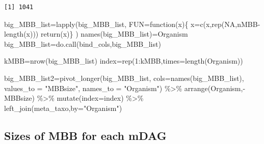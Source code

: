 \documentclass[
  letterpaper,
  DIV=11,
  numbers=noendperiod]{scrreprt}
\newenvironment{Shaded}{}{}
\newcommand{\AttributeTok}[1]{\textcolor[rgb]{0.78,0.47,0.87}{#1}}
\newcommand{\ConstantTok}[1]{\textcolor[rgb]{0.82,0.60,0.40}{#1}}
\newcommand{\ControlFlowTok}[1]{\textcolor[rgb]{0.78,0.47,0.87}{#1}}
\newcommand{\DecValTok}[1]{\textcolor[rgb]{0.82,0.60,0.40}{#1}}
\newcommand{\FunctionTok}[1]{\textcolor[rgb]{0.38,0.69,0.94}{#1}}
\newcommand{\NormalTok}[1]{\textcolor[rgb]{0.67,0.70,0.75}{#1}}
\newcommand{\OtherTok}[1]{\textcolor[rgb]{0.15,0.68,0.38}{#1}}
\newcommand{\SpecialCharTok}[1]{\textcolor[rgb]{0.34,0.71,0.76}{#1}}
\newcommand{\StringTok}[1]{\textcolor[rgb]{0.60,0.76,0.47}{#1}}
\begin{document}
\begin{verbatim}
[1] 1041
\end{verbatim}

\begin{Shaded}
\begin{Highlighting}[]
\NormalTok{big\_MBB\_list}\OtherTok{=}\FunctionTok{lapply}\NormalTok{(big\_MBB\_list,}
                    \AttributeTok{FUN=}\ControlFlowTok{function}\NormalTok{(x)\{}
\NormalTok{                      x}\OtherTok{=}\FunctionTok{c}\NormalTok{(x,}\FunctionTok{rep}\NormalTok{(}\ConstantTok{NA}\NormalTok{,nMBB}\SpecialCharTok{{-}}\FunctionTok{length}\NormalTok{(x)))}
                      \FunctionTok{return}\NormalTok{(x)\}}
\NormalTok{)}
\FunctionTok{names}\NormalTok{(big\_MBB\_list)}\OtherTok{=}\NormalTok{Organism}
\NormalTok{big\_MBB\_list}\OtherTok{=}\FunctionTok{do.call}\NormalTok{(bind\_cols,big\_MBB\_list)}

\NormalTok{kMBB}\OtherTok{=}\FunctionTok{nrow}\NormalTok{(big\_MBB\_list)}
\NormalTok{index}\OtherTok{=}\FunctionTok{rep}\NormalTok{(}\DecValTok{1}\SpecialCharTok{:}\NormalTok{kMBB,}\AttributeTok{times=}\FunctionTok{length}\NormalTok{(Organism))}

\NormalTok{big\_MBB\_list2}\OtherTok{=}\FunctionTok{pivot\_longer}\NormalTok{(big\_MBB\_list,}
                           \AttributeTok{cols=}\FunctionTok{names}\NormalTok{(big\_MBB\_list),}
                           \AttributeTok{values\_to =} \StringTok{"MBBsize"}\NormalTok{,}
                           \AttributeTok{names\_to =} \StringTok{"Organism"}\NormalTok{) }\SpecialCharTok{\%\textgreater{}\%} 
  \FunctionTok{arrange}\NormalTok{(Organism,}\SpecialCharTok{{-}}\NormalTok{MBBsize) }\SpecialCharTok{\%\textgreater{}\%}  
  \FunctionTok{mutate}\NormalTok{(}\AttributeTok{index=}\NormalTok{index) }\SpecialCharTok{\%\textgreater{}\%} 
  \FunctionTok{left\_join}\NormalTok{(meta\_taxo,}\AttributeTok{by=}\StringTok{"Organism"}\NormalTok{)}
\end{Highlighting}
\end{Shaded}

\hypertarget{sizes-of-mbb-for-each-mdag}{%
\subsection{Sizes of MBB for each
mDAG}\label{sizes-of-mbb-for-each-mdag}}
\end{document}
